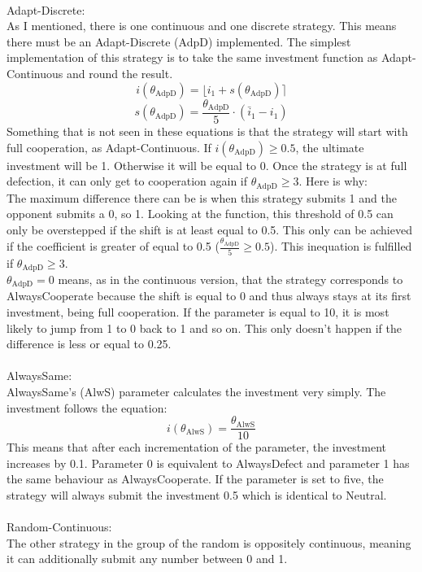 \documentclass{article}
\newcommand{\round}[1]{\ensuremath{\lfloor#1\rceil}}
\begin{document}
\begin{itemize}
		\\Adapt-Discrete:\\
As I mentioned, there is one continuous and one discrete strategy.
This means there must be an Adapt-Discrete (AdpD) implemented.
The simplest implementation of this strategy is to take the same investment function as Adapt-Continuous and round the result.
$$i(\theta_{\mathrm{AdpD}}) = \round{i_1 + s(\theta_{\mathrm{AdpD}})}$$
$$s(\theta_{\mathrm{AdpD}}) = \frac{\theta_{\mathrm{AdpD}}}{5} \cdot (\bar i_1 - i_1)$$
Something that is not seen in these equations is that the strategy will start with full cooperation, as Adapt-Continuous.
If $i(\theta_{\mathrm{AdpD}}) \ge 0.5$, the ultimate investment will be 1.
Otherwise it will be equal to 0.
Once the strategy is at full defection, it can only get to cooperation again if $\theta_{\mathrm{AdpD}} \ge 3$.
Here is why:\\
The maximum difference there can be is when this strategy submits 1 and the opponent submits a 0, so 1.
Looking at the function, this threshold of 0.5 can only be overstepped if the shift is at least equal to 0.5.
This only can be achieved if the coefficient is greater of equal to 0.5 ($\frac{\theta_{\mathrm{AdpD}}}{5} \ge 0.5$).
This inequation is fulfilled if $\theta_{\mathrm{AdpD}} \ge 3$.\\
$\theta_{\mathrm{AdpD}} = 0$ means, as in the continuous version, that the strategy corresponds to AlwaysCooperate because the shift is equal to 0 and thus always stays at its first investment, being full cooperation.
If the parameter is equal to 10, it is most likely to jump from 1 to 0 back to 1 and so on.
This only doesn't happen if the difference is less or equal to 0.25.\\
		\\AlwaysSame:\\
AlwaysSame's (AlwS) parameter calculates the investment very simply.
The investment follows the equation: 
$$i(\theta_{\mathrm{AlwS}}) = \frac{\theta_{\mathrm{AlwS}}}{10}$$
This means that after each incrementation of the parameter, the investment increases by 0.1.
Parameter 0 is equivalent to AlwaysDefect and parameter 1 has the same behaviour as AlwaysCooperate.
If the parameter is set to five, the strategy will always submit the investment 0.5 which is identical to Neutral.\\
		\\Random-Continuous:\\
The other strategy in the group of the random is oppositely continuous, meaning it can additionally submit any number between 0 and 1.

\end{itemize}
\end{document}

